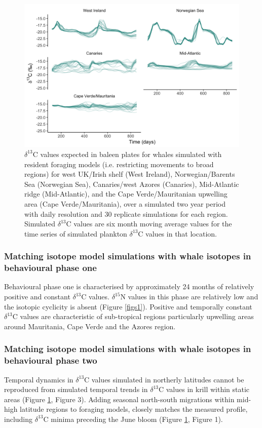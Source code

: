\documentclass[a4paper,12pt]{article}
\begin{document}
  \begin{figure}[!htbp]
    \centering
      \includegraphics[width=\linewidth]{figures/Figure-S4-regions-d13C.png}
      \caption{$\delta^{13}$C values expected in baleen plates for whales simulated with resident foraging models (i.e. restricting movements to broad regions) for west UK/Irish shelf (West Ireland), Norwegian/Barents Sea (Norwegian Sea), Canaries/west Azores (Canaries), Mid-Atlantic ridge (Mid-Atlantic), and the Cape Verde/Mauritanian upwelling area (Cape Verde/Mauritania), over a simulated two year period with daily resolution and 30 replicate simulations for each region. 
      Simulated $\delta^{13}$C values are six month moving average values for the time series of simulated plankton $\delta^{13}$C values in that location.}
      \label{figs4}
  \end{figure}
 
\subsubsection*{Matching isotope model simulations with whale isotopes in behavioural phase one}
Behavioural phase one is characterised by approximately 24 months of relatively positive and constant $\delta^{13}$C values. 
$\delta^{15}$N values in this phase are relatively low and the isotopic cyclicity is absent (Figure \ref{figs1}). 
Positive and temporally constant $\delta^{13}$C values are characteristic of sub-tropical regions particularly upwelling areas around Mauritania, Cape Verde and the Azores region.
 
\subsubsection*{Matching isotope model simulations with whale isotopes in behavioural phase two}
Temporal dynamics in $\delta^{13}$C values simulated in northerly latitudes cannot be reproduced from simulated temporal trends in $\delta^{13}$C values in krill within static areas (Figure \ref{figs4}, Figure 3). 
Adding seasonal north-south migrations within mid-high latitude regions to foraging models, closely matches the measured profile, including $\delta^{13}$C minima preceding the June bloom (Figure \ref{figs4}, Figure 1).
\end{document}
